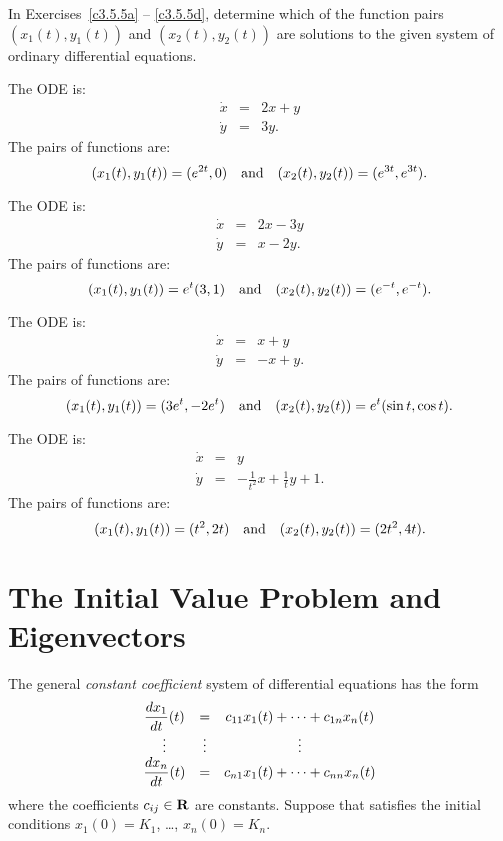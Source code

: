 \noindent In Exercises~\ref{c3.5.5a} -- \ref{c3.5.5d}, determine which of
the function pairs $(x_1(t),y_1(t))$ and $(x_2(t),y_2(t))$ are solutions
to the given system of ordinary differential equations.
\begin{exercise} \label{c3.5.5a}
The ODE is:
\begin{eqnarray*}
\dot{x} & = & 2x+y  \\
\dot{y} & = & 3y.
\end{eqnarray*}
The pairs of functions are:
\[
(x_1(t),y_1(t)) = (e^{2t},0)  \quad\mbox{and}\quad (x_2(t),y_2(t)) = (e^{3t},e^{3t}).
\]
\end{exercise}
\begin{exercise} \label{c3.5.5b}
The ODE is:
\begin{eqnarray*}
\dot{x} & = & 2x - 3y  \\
\dot{y} & = & x - 2y.
\end{eqnarray*}
The pairs of functions are:
\[
(x_1(t),y_1(t)) = e^t(3,1)  \quad\mbox{and}\quad (x_2(t),y_2(t)) = (e^{-t},e^{-t}).
\]
\end{exercise}
\begin{exercise} \label{c3.5.5c}
The ODE is:
\begin{eqnarray*}
\dot{x} & = &  x + y \\
\dot{y} & = & -x + y.
\end{eqnarray*}
The pairs of functions are:
\[
(x_1(t),y_1(t)) =  (3e^t, -2e^t) \quad\mbox{and}\quad (x_2(t),y_2(t)) = e^t(\sin t,\cos t).
\]
\end{exercise}
\begin{exercise} \label{c3.5.5d}
The ODE is:
\begin{eqnarray*}
\dot{x} & = & y  \\
\dot{y} & = &  -\frac{1}{t^2}x + \frac{1}{t}y + 1.
\end{eqnarray*}
The pairs of functions are:
\[
(x_1(t),y_1(t)) = (t^2,2t)  \quad\mbox{and}\quad (x_2(t),y_2(t)) = (2t^2,4t).
\]
\end{exercise}


\section{The Initial Value Problem and Eigenvectors}
\label{S:IVP&E} 

The general {\em constant coefficient\/}
system of differential equations has the form
\renewcommand{\arraystretch}{1.8}
\begin{equation}\label{lingen}
\begin{array}{ccc}
\displaystyle \frac{dx_1}{dt}(t) & = & c_{11}x_1(t) + \cdots + c_{1n}x_n(t) \\
\vdots  & \vdots & \vdots \\
\displaystyle \frac{dx_n}{dt}(t) & = & c_{n1}x_1(t) + \cdots + c_{nn}x_n(t)
\end{array}
\end{equation}
\renewcommand{\arraystretch}{1.0}%
where the coefficients $c_{ij}\in \mbox{$\bf{R}$}$ are constants.  Suppose that 
 satisfies the initial conditions $x_1(0) = K_1$, \ldots,  
$x_n(0) = K_n$.

